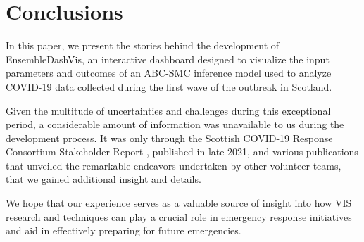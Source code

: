 \section{Conclusions}


In this paper, we present the stories behind the development of EnsembleDashVis, an interactive dashboard designed to visualize the input parameters and outcomes of an \ac{ABC-SMC} inference model used to analyze COVID-19 data collected during the first wave of the outbreak in Scotland.

Given the multitude of uncertainties and challenges during this exceptional period, a considerable amount of information was unavailable to us during the development process. It was only through the Scottish COVID-19 Response Consortium Stakeholder Report \cite{abdalla2021Scottish}, published in late 2021, and various publications \cite{chen2022RAMPVIS,dykes2022Visualizationb,khan2022Propagating,khan2022Rapid} that unveiled the remarkable endeavors undertaken by other volunteer teams, that we gained additional insight and details.

We hope that our experience serves as a valuable source of insight into how VIS research and techniques can play a crucial role in emergency response initiatives and aid in effectively preparing for future emergencies.